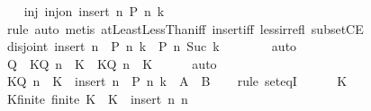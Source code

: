 \begin{isabellebody}
\ \ \isamarkupfalse%
\ inj{\isacharcolon}{\kern0pt}\ {\isachardoublequoteopen}inj{\isacharunderscore}{\kern0pt}on\ {\isacharparenleft}{\kern0pt}insert\ n{\isacharparenright}{\kern0pt}\ {\isacharparenleft}{\kern0pt}{\isacharquery}{\kern0pt}P\ n\ k{\isacharparenright}{\kern0pt}{\isachardoublequoteclose}\isanewline
\ \ \ \ \isamarkupfalse%
\ rule\ {\isacharparenleft}{\kern0pt}auto{\isacharsemicolon}{\kern0pt}\ metis\ atLeastLessThan{\isacharunderscore}{\kern0pt}iff\ insert{\isacharunderscore}{\kern0pt}iff\ less{\isacharunderscore}{\kern0pt}irrefl\ subsetCE{\isacharparenright}{\kern0pt}\isanewline
\ \ \isamarkupfalse%
\ disjoint{\isacharcolon}{\kern0pt}\ {\isachardoublequoteopen}insert\ n\ {\isacharbackquote}{\kern0pt}\ {\isacharquery}{\kern0pt}P\ n\ k\ {\isasyminter}\ {\isacharquery}{\kern0pt}P\ n\ {\isacharparenleft}{\kern0pt}Suc\ k{\isacharparenright}{\kern0pt}\ {\isacharequal}{\kern0pt}\ {\isacharbraceleft}{\kern0pt}{\isacharbraceright}{\kern0pt}{\isachardoublequoteclose}\isanewline
\ \ \ \ \isamarkupfalse%
\ auto\isanewline
\ \ \isamarkupfalse%
\ {\isachardoublequoteopen}{\isacharquery}{\kern0pt}Q\ {\isacharequal}{\kern0pt}\ {\isacharbraceleft}{\kern0pt}K{\isasymin}{\isacharquery}{\kern0pt}Q{\isachardot}{\kern0pt}\ n\ {\isasymin}\ K{\isacharbraceright}{\kern0pt}\ {\isasymunion}\ {\isacharbraceleft}{\kern0pt}K{\isasymin}{\isacharquery}{\kern0pt}Q{\isachardot}{\kern0pt}\ n\ {\isasymnotin}\ K{\isacharbraceright}{\kern0pt}{\isachardoublequoteclose}\isanewline
\ \ \ \ \isamarkupfalse%
\ auto\isanewline
\ \ \isamarkupfalse%
\ \isamarkupfalse%
\ {\isachardoublequoteopen}{\isacharbraceleft}{\kern0pt}K{\isasymin}{\isacharquery}{\kern0pt}Q{\isachardot}{\kern0pt}\ n\ {\isasymin}\ K{\isacharbraceright}{\kern0pt}\ {\isacharequal}{\kern0pt}\ insert\ n\ {\isacharbackquote}{\kern0pt}\ {\isacharquery}{\kern0pt}P\ n\ k{\isachardoublequoteclose}\ {\isacharparenleft}{\kern0pt}\ {\isachardoublequoteopen}{\isacharquery}{\kern0pt}A\ {\isacharequal}{\kern0pt}\ {\isacharquery}{\kern0pt}B{\isachardoublequoteclose}{\isacharparenright}{\kern0pt}\isanewline
\ \ \isamarkupfalse%
\ {\isacharparenleft}{\kern0pt}rule\ set{\isacharunderscore}{\kern0pt}eqI{\isacharparenright}{\kern0pt}\isanewline
\ \ \ \ \isamarkupfalse%
\ K\isanewline
\ \ \ \ \isamarkupfalse%
\ K{\isacharunderscore}{\kern0pt}finite{\isacharcolon}{\kern0pt}\ {\isachardoublequoteopen}finite\ K{\isachardoublequoteclose}\ \ {\isachardoublequoteopen}K\ {\isasymsubseteq}\ insert\ n\ {\isacharbraceleft}{\kern0pt}{}{\isachardot}{\kern0pt}{\isachardot}{\kern0pt}{\isacharless}{\kern0pt}n{\isacharbraceright}{\kern0pt}{\isachardoublequoteclose}\isanewline

\end{isabellebody}
